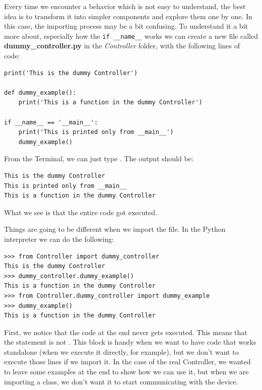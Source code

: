 Every time we encounter a behavior which is not easy to understand, the best idea is to transform it into simpler components and explore them one by one. In this case, the importing process may be a bit confusing. To understand it a bit more about, especially how the \texttt{if __name__} works we can create a new file called \textbf{dummy\_controller.py} in the \emph{Controller} folder, with the following lines of code:

\begin{verbatim}
print('This is the dummy Controller')

def dummy_example():
    print('This is a function in the dummy Controller')

if __name__ == '__main__':
    print('This is printed only from __main__')
    dummy_example()

\end{verbatim}

From the Terminal, we can just type . The output should be:

\begin{verbatim}
This is the dummy Controller
This is printed only from __main__
This is a function in the dummy Controller
\end{verbatim}

What we see is that the entire code got executed.


Things are going to be different when we import the file. In the Python interpreter we can do the following:

\begin{verbatim}
>>> from Controller import dummy_controller
This is the dummy Controller
>>> dummy_controller.dummy_example()
This is a function in the dummy Controller
>>> from Controller.dummy_controller import dummy_example
>>> dummy_example()
This is a function in the dummy Controller
\end{verbatim}

First, we notice that the code at the end never gets executed. This means that the  statement is not . This block is handy when we want to have code that works standalone (when we execute it directly, for example), but we don't want to execute those lines if we import it. In the case of the real Controller, we wanted to leave some examples at the end to show how we can use it, but when we are importing a class, we don't want it to start communicating with the device.


